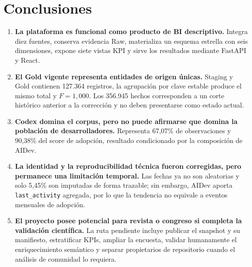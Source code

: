 \documentclass[12pt,a4paper]{article}
\newcommand{\pathcode}[1]{\begingroup\small\ttfamily\nolinkurl{#1}\endgroup}
\begin{document}
\section{Conclusiones}

\begin{enumerate}[leftmargin=1.1cm]
  \item \textbf{La plataforma es funcional como producto de BI descriptivo.} Integra diez fuentes, conserva evidencia Raw, materializa un esquema estrella con seis dimensiones, expone siete vistas KPI y sirve los resultados mediante FastAPI y React.

  \item \textbf{El Gold vigente representa entidades de origen únicas.} Staging y Gold contienen 127.364 registros, la agrupación por clave estable produce el mismo total y $F=1,000$. Los 356.945 hechos corresponden a un corte histórico anterior a la corrección y no deben presentarse como estado actual.

  \item \textbf{Codex domina el corpus, pero no puede afirmarse que domina la población de desarrolladores.} Representa 67,07\% de observaciones y 90,38\% del score de adopción, resultado condicionado por la composición de AIDev.

  \item \textbf{La identidad y la reproducibilidad técnica fueron corregidas, pero permanece una limitación temporal.} Las fechas ya no son aleatorias y solo 5,45\% son imputadas de forma trazable; sin embargo, AIDev aporta \pathcode{last_activity} agregada, por lo que la tendencia no equivale a eventos mensuales de adopción.

  \item \textbf{El proyecto posee potencial para revista o congreso si completa la validación científica.} La ruta pendiente incluye publicar el snapshot y su manifiesto, estratificar KPIs, ampliar la encuesta, validar humanamente el enriquecimiento semántico y separar propietarios de repositorio cuando el análisis de comunidad lo requiera.
\end{enumerate}
\end{document}
